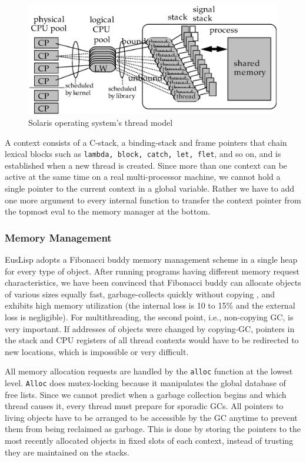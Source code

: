 \begin{figure}[b]
\begin{center}
\includegraphics[width=13cm]{fig/threadfig.ps}

\caption{Solaris operating system's thread model}\label{threadmodel}
\end{center}
\end{figure}

A context consists of a C-stack, a binding-stack and frame 
pointers that chain lexical blocks such as {\tt lambda, block, catch,
let, flet}, and so on,  and is established when a new thread
is created. Since more than one context can be active at
the same time on a real multi-processor machine, we cannot
hold a single pointer to the current context in a global variable.
Rather we have to add one more argument to every internal
function to transfer the context pointer  from the topmost eval
to the memory manager at the bottom.

\subsubsection{Memory Management}
EusLisp adopts a Fibonacci buddy memory management scheme in a
single heap for every type of object. 
After running programs having
different memory request characteristics, we have been convinced that
Fibonacci buddy can allocate objects of various sizes equally fast,
garbage-collects quickly without copying , and exhibits high memory
utilization (the internal loss is 10 to 15\% and the
external loss is negligible).
For multithreading, the second point, i.e., non-copying GC, is very
important.
If addresses of objects were changed by copying-GC, pointers in the
stack and CPU registers of all thread contexts would have to be
redirected to new locations, which is impossible or very difficult. 

All memory allocation requests are handled by the {\tt alloc} function at the
lowest level.
{\tt Alloc} does mutex-locking because it manipulates the global
database of free lists.
Since we cannot predict when a garbage
collection begins and which thread causes it, every thread must prepare
for sporadic GCs.  All pointers to living objects have to be arranged
to be accessible by the GC anytime to prevent them from being reclaimed
as garbage.  This is done by storing the pointers to the most recently
allocated objects in fixed slots of each context, instead of trusting
they are maintained on the stacks.

